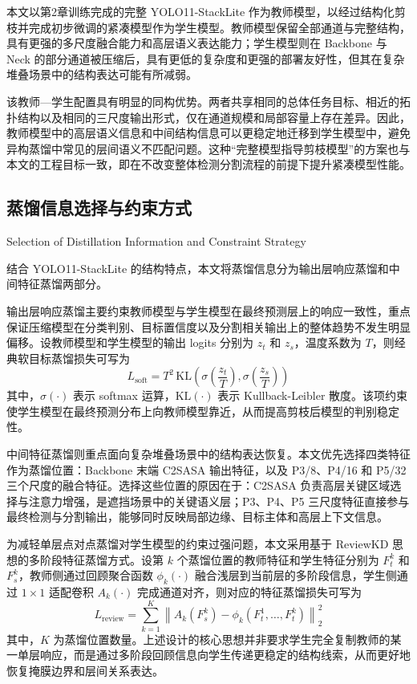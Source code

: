 本文以第2章训练完成的完整 YOLO11-StackLite 作为教师模型，以经过结构化剪枝并完成初步微调的紧凑模型作为学生模型。教师模型保留全部通道与完整结构，具有更强的多尺度融合能力和高层语义表达能力；学生模型则在 Backbone 与 Neck 的部分通道被压缩后，具有更低的复杂度和更强的部署友好性，但其在复杂堆叠场景中的结构表达可能有所减弱。

该教师—学生配置具有明显的同构优势。两者共享相同的总体任务目标、相近的拓扑结构以及相同的三尺度输出形式，仅在通道规模和局部容量上存在差异。因此，教师模型中的高层语义信息和中间结构信息可以更稳定地迁移到学生模型中，避免异构蒸馏中常见的层间语义不匹配问题。这种“完整模型指导剪枝模型”的方案也与本文的工程目标一致，即在不改变整体检测分割流程的前提下提升紧凑模型性能。

\subsection{蒸馏信息选择与约束方式}{Selection of Distillation Information and Constraint Strategy}

结合 YOLO11-StackLite 的结构特点，本文将蒸馏信息分为输出层响应蒸馏和中间特征蒸馏两部分。

输出层响应蒸馏主要约束教师模型与学生模型在最终预测层上的响应一致性，重点保证压缩模型在分类判别、目标置信度以及分割相关输出上的整体趋势不发生明显偏移。设教师模型和学生模型的输出 logits 分别为 $z_t$ 和 $z_s$，温度系数为 $T$，则经典软目标蒸馏损失可写为
\begin{equation}
L_{\mathrm{soft}} = T^2 \, \mathrm{KL}\left(\sigma\left(\frac{z_t}{T}\right), \sigma\left(\frac{z_s}{T}\right)\right)
\end{equation}
其中，$\sigma(\cdot)$ 表示 softmax 运算，$\mathrm{KL}(\cdot)$ 表示 Kullback-Leibler 散度。该项约束使学生模型在最终预测分布上向教师模型靠近，从而提高剪枝后模型的判别稳定性。

中间特征蒸馏则重点面向复杂堆叠场景中的结构表达恢复。本文优先选择四类特征作为蒸馏位置：Backbone 末端 C2SASA 输出特征，以及 P3/8、P4/16 和 P5/32 三个尺度的融合特征。选择这些位置的原因在于：C2SASA 负责高层关键区域选择与注意力增强，是遮挡场景中的关键语义层；P3、P4、P5 三尺度特征直接参与最终检测与分割输出，能够同时反映局部边缘、目标主体和高层上下文信息。

为减轻单层点对点蒸馏对学生模型的约束过强问题，本文采用基于 ReviewKD 思想的多阶段特征蒸馏方式。设第 $k$ 个蒸馏位置的教师特征和学生特征分别为 $F_t^k$ 和 $F_s^k$，教师侧通过回顾聚合函数 $\phi_k(\cdot)$ 融合浅层到当前层的多阶段信息，学生侧通过 $1\times1$ 适配卷积 $A_k(\cdot)$ 完成通道对齐，则对应的特征蒸馏损失可写为
\begin{equation}
L_{\mathrm{review}} = \sum_{k=1}^{K} \left\| A_k(F_s^k) - \phi_k(F_t^1,\ldots,F_t^k) \right\|_2^2
\end{equation}
其中，$K$ 为蒸馏位置数量。上述设计的核心思想并非要求学生完全复制教师的某一单层响应，而是通过多阶段回顾信息向学生传递更稳定的结构线索，从而更好地恢复掩膜边界和层间关系表达。

